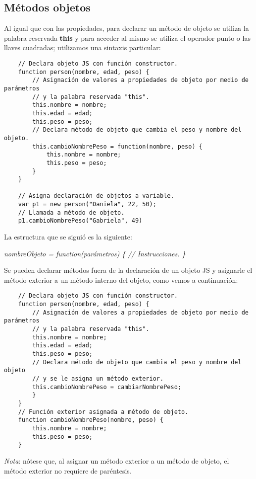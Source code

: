 \subsection{Métodos objetos}
\hspace{0.55cm}Al igual que con las propiedades, para declarar un método de objeto se utiliza la palabra reservada \textbf{this} y para acceder al mismo se utiliza el operador punto o las llaves cuadradas; utilizamos una sintaxis particular:
\begin{lstlisting}
    // Declara objeto JS con función constructor.
    function person(nombre, edad, peso) {
        // Asignación de valores a propiedades de objeto por medio de parámetros
        // y la palabra reservada "this".
        this.nombre = nombre;
        this.edad = edad;
        this.peso = peso;
        // Declara método de objeto que cambia el peso y nombre del objeto.
        this.cambioNombrePeso = function(nombre, peso) {
            this.nombre = nombre;
            this.peso = peso;
        }
    }

    // Asigna declaración de objetos a variable.
    var p1 = new person("Daniela", 22, 50);
    // Llamada a método de objeto.
    p1.cambioNombrePeso("Gabriela", 49)
\end{lstlisting}

La estructura que se siguió es la siguiente:
\begin{center}
    \textit{nombreObjeto = function(parámetros) \{ // Instrucciones. \}}
\end{center}

Se pueden declarar métodos fuera de la declaración de un objeto JS y asignarle el método exterior a un método interno del objeto, como vemos a continuación:
\begin{lstlisting}
    // Declara objeto JS con función constructor.
    function person(nombre, edad, peso) {
        // Asignación de valores a propiedades de objeto por medio de parámetros
        // y la palabra reservada "this".
        this.nombre = nombre;
        this.edad = edad;
        this.peso = peso;
        // Declara método de objeto que cambia el peso y nombre del objeto
        // y se le asigna un método exterior.
        this.cambioNombrePeso = cambiarNombrePeso;
        }
    }
    // Función exterior asignada a método de objeto.
    function cambioNombrePeso(nombre, peso) {
        this.nombre = nombre;
        this.peso = peso;
    }
\end{lstlisting}

\textit{Nota}: nótese que, al asignar un método exterior a un método de objeto, el método exterior no requiere de paréntesis.


